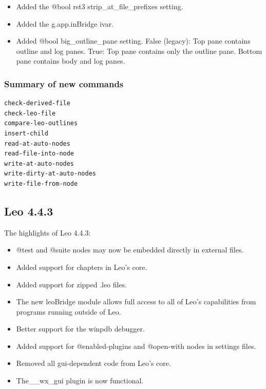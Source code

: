 \documentclass[a4paper,10pt,english]{sphinxmanual}
\begin{document}
\begin{itemize}
\item {} 
Added the @bool rst3 strip\_at\_file\_prefixes setting.

\item {} 
Added the g.app.inBridge ivar.

\item {} 
Added @bool big\_outline\_pane setting. False (legacy): Top pane contains outline and log panes.
True: Top pane contains only the outline pane.  Bottom pane contains body and log panes.

\end{itemize}


\subsubsection{Summary of new commands}
\label{what-is-new:summary-of-new-commands}
\begin{Verbatim}[commandchars=\\\{\}]
check-derived-file
check-leo-file
compare-leo-outlines
insert-child
read-at-auto-nodes
read-file-into-node
write-at-auto-nodes
write-dirty-at-auto-nodes
write-file-from-node
\end{Verbatim}


\subsection{Leo 4.4.3}
\label{what-is-new:leo-4-4-3}
The highlights of Leo 4.4.3:
\begin{itemize}
\item {} 
@test and @suite nodes may now be embedded directly in external files.

\item {} 
Added support for chapters in Leo's core.

\item {} 
Added support for zipped .leo files.

\item {} 
The new leoBridge module allows full access to all of Leo's capabilities
from programs running outside of Leo.

\item {} 
Better support for the winpdb debugger.

\item {} 
Added support for @enabled-plugins and @open-with nodes in settings files.

\item {} 
Removed all gui-dependent code from Leo's core.

\item {} 
The\_\_wx\_gui plugin is now functional.

\end{itemize}
\end{document}
